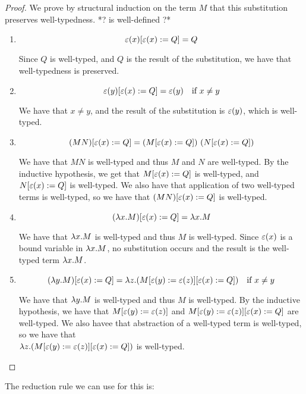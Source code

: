 \begin{proof}
  We prove by structural induction on the term $M$ that this substitution preserves well-typedness.  *? is well-defined ?*
  \begin{enumerate}
    \item%
    \[
    \varepsilon(x)[\varepsilon(x) := Q] = Q
    \]
    
    Since $Q$ is well-typed, and $Q$ is the result of the substitution, we have that well-typedness is preserved.
    \item%
    \[
    \varepsilon(y)[\varepsilon(x) := Q] = \varepsilon(y) \quad \text{if} \ x \neq y
    \]
  
    We have that $x \neq y$, and the result of the substitution is $\varepsilon(y)$, which is well-typed.
    
    \item%
    \[
    (M N)[\varepsilon(x) := Q] = (M[\varepsilon(x) := Q]) \ (N[\varepsilon(x) := Q])
    \]
  
    We have that $M N$ is well-typed and thus $M$ and $N$ are well-typed.
    By the inductive hypothesis, we get that $M[\varepsilon(x) := Q]$ is well-typed, and $N[\varepsilon(x) := Q]$ is well-typed.
    We also have that application of two well-typed terms is well-typed, so we have that $(M N)[\varepsilon(x) := Q]$ is well-typed.
  
    \item%
    \[
    (\lambda {x}.{M})[\varepsilon(x) := Q] = \lambda {x}.{M}
    \]
  
    We have that $\lambda {x}.{M}$ is well-typed and thus $M$ is well-typed.
    Since $\varepsilon(x)$ is a bound variable in $\lambda {x}.{M}$, no substitution occurs and the result is the well-typed term $\lambda {x}.{M}$.
  
    \item%
    \[
    (\lambda {y}.{M})[\varepsilon(x) := Q] = \lambda {z}.{(M[\varepsilon(y) := \varepsilon(z)][\varepsilon(x) := Q])} \quad \text{if} \ x \neq y
    \]
  
    We have that $\lambda {y}.{M}$ is well-typed and thus $M$ is well-typed.
    By the inductive hypothesis, we have that $M[\varepsilon(y) := \varepsilon(z)]$ and $M[\varepsilon(y) := \varepsilon(z)][\varepsilon(x) := Q]$ are well-typed.
    We also havee that abstraction of a well-typed term is well-typed, so we have that \\
    $\lambda {z}.{(M[\varepsilon(y) := \varepsilon(z)][\varepsilon(x) := Q])}$ is well-typed.
  \end{enumerate}
\end{proof}

The reduction rule we can use for this \lc is:

